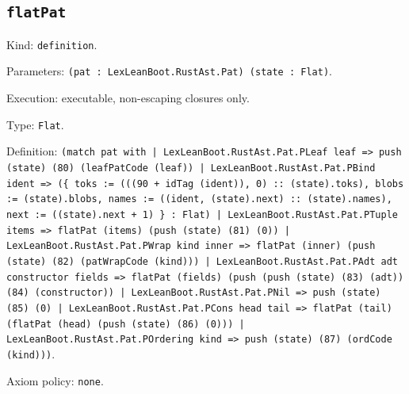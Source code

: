 \documentclass[11pt]{article}
\begin{document}
\subsection*{\texttt{flatPat}}
\noindent Kind: \texttt{definition}.\par
\noindent Parameters: \texttt{(pat : LexLeanBoot.RustAst.Pat) (state : Flat)}.\par
\noindent Execution: executable, non-escaping closures only.\par
\noindent Type: \texttt{Flat}.\par
\noindent Definition: \texttt{(match pat with | LexLeanBoot.RustAst.Pat.PLeaf leaf => push (state) (80) (leafPatCode (leaf)) | LexLeanBoot.RustAst.Pat.PBind ident => (\{ toks := (((90 + idTag (ident)), 0) :: (state).toks), blobs := (state).blobs, names := ((ident, (state).next) :: (state).names), next := ((state).next + 1) \} : Flat) | LexLeanBoot.RustAst.Pat.PTuple items => flatPat (items) (push (state) (81) (0)) | LexLeanBoot.RustAst.Pat.PWrap kind inner => flatPat (inner) (push (state) (82) (patWrapCode (kind))) | LexLeanBoot.RustAst.Pat.PAdt adt constructor fields => flatPat (fields) (push (push (state) (83) (adt)) (84) (constructor)) | LexLeanBoot.RustAst.Pat.PNil => push (state) (85) (0) | LexLeanBoot.RustAst.Pat.PCons head tail => flatPat (tail) (flatPat (head) (push (state) (86) (0))) | LexLeanBoot.RustAst.Pat.POrdering kind => push (state) (87) (ordCode (kind)))}.\par
\noindent Axiom policy: \texttt{none}.\par
\end{document}
